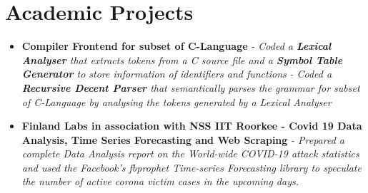 \documentclass{article}
\begin{document}
\section*{Academic Projects}
    \begin{itemize}
        \item{\textbf{\large{Compiler Frontend for subset of C-Language}}}
        \newline
        \textit{- Coded a \textbf{Lexical Analyser} that extracts tokens from a C source file and a \textbf{Symbol Table Generator} to store information of identifiers and functions }
        \newline
        \textit{- Coded a \textbf{Recursive Decent Parser} that semantically parses the grammar for subset of C-Language by analysing the tokens generated by a Lexical Analyser}

        \item{\textbf{\large{Finland Labs in association with NSS IIT Roorkee - Covid 19 Data Analysis, Time Series Forecasting and Web Scraping}}}
        \newline
        \textit{- Prepared a complete Data Analysis report on the World-wide COVID-19 attack statistics and used the Facebook's fbprophet Time-series Forecasting library to speculate the number of active corona victim cases in the upcoming days.}  
    

\end{itemize}
\end{document}
